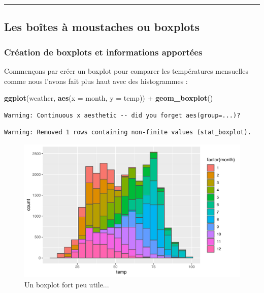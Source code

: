 \documentclass[a4paperpaper,]{article}
\newenvironment{Shaded}{\begin{snugshade}}{\end{snugshade}}
\newcommand{\DataTypeTok}[1]{\textcolor[rgb]{0.00,0.34,0.68}{#1}}
\newcommand{\KeywordTok}[1]{\textcolor[rgb]{0.12,0.11,0.11}{\textbf{#1}}}
\newcommand{\NormalTok}[1]{\textcolor[rgb]{0.12,0.11,0.11}{#1}}
\newcommand{\OperatorTok}[1]{\textcolor[rgb]{0.12,0.11,0.11}{#1}}
\newcommand{\StringTok}[1]{\textcolor[rgb]{0.75,0.01,0.01}{#1}}
\begin{document}
\begin{center}\rule{0.5\linewidth}{\linethickness}\end{center}

\hypertarget{les-boites-a-moustaches-ou-boxplots}{%
\subsection{Les boîtes à moustaches ou boxplots}\label{les-boites-a-moustaches-ou-boxplots}}

\hypertarget{creation-de-boxplots-et-informations-apportees}{%
\subsubsection{Création de boxplots et informations apportées}\label{creation-de-boxplots-et-informations-apportees}}

Commençons par créer un boxplot pour comparer les températures mensuelles comme nous l'avons fait plus haut avec des histogrammes :

\begin{Shaded}
\begin{Highlighting}[]
\KeywordTok{ggplot}\NormalTok{(weather, }\KeywordTok{aes}\NormalTok{(}\DataTypeTok{x =}\NormalTok{ month, }\DataTypeTok{y =}\NormalTok{ temp)) }\OperatorTok{+}
\StringTok{  }\KeywordTok{geom_boxplot}\NormalTok{()}
\end{Highlighting}
\end{Shaded}

\begin{verbatim}
Warning: Continuous x aesthetic -- did you forget aes(group=...)?
\end{verbatim}

\begin{verbatim}
Warning: Removed 1 rows containing non-finite values (stat_boxplot).
\end{verbatim}

\begin{figure}[htpb]

{\centering \includegraphics[width=0.9\linewidth]{figure/unnamed-chunk-53-1} 

}

\caption{Un boxplot fort peu utile...}\label{fig:unnamed-chunk-53}
\end{figure}
\end{document}
